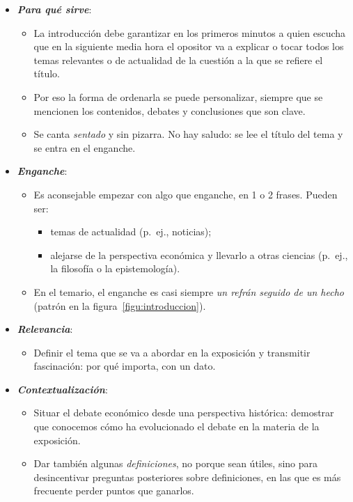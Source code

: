 \documentclass[11pt]{article}
\begin{document}
\begin{itemize}
\item \textbf{\emph{Para qué sirve}}:
  \begin{itemize}
  \item La introducción debe garantizar en los primeros minutos a quien escucha que en la siguiente media hora el opositor va a explicar o tocar todos los temas relevantes o de actualidad de la cuestión a la que se refiere el título.
  \item Por eso la forma de ordenarla se puede personalizar, siempre que se mencionen los contenidos, debates y conclusiones que son clave.
  \item Se canta \emph{sentado} y sin pizarra. No hay saludo: se lee el título del tema y se entra en el enganche.
  \end{itemize}
\item \textbf{\emph{Enganche}}:
  \begin{itemize}
  \item Es aconsejable empezar con algo que enganche, en 1 o 2 frases. Pueden ser:
    \begin{itemize}
    \item temas de actualidad (p.~ej., noticias);
    \item alejarse de la perspectiva económica y llevarlo a otras ciencias (p.~ej., la filosofía o la epistemología).
    \end{itemize}
  \item En el temario, el enganche es casi siempre \emph{un refrán seguido de un hecho} (patrón en la figura~\ref{figu:introduccion}).
  \end{itemize}
\item \textbf{\emph{Relevancia}}:
  \begin{itemize}
  \item Definir el tema que se va a abordar en la exposición y transmitir fascinación: por qué importa, con un dato.
  \end{itemize}
\item \textbf{\emph{Contextualización}}:
  \begin{itemize}
  \item Situar el debate económico desde una perspectiva histórica: demostrar que conocemos cómo ha evolucionado el debate en la materia de la exposición.
  \item Dar también algunas \emph{definiciones}, no porque sean útiles, sino para desincentivar preguntas posteriores sobre definiciones, en las que es más frecuente perder puntos que ganarlos.

\end{itemize}
\end{itemize}
\end{document}
